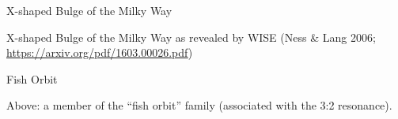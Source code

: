 \documentclass[letterpaper,landscape]{slides}
\begin{document}
\begin{slide}
\begin{center}
{\large \color{red} 
                       X-shaped Bulge of the Milky Way }
\end{center}

\begin{center}
\vskip 0.0in
\end{center}

X-shaped Bulge of the Milky Way as revealed by WISE (Ness \& Lang 2006;
\url{https://arxiv.org/pdf/1603.00026.pdf})

\vfill
\end{slide}

\begin{slide}
\begin{center}
{\large \color{red} 
                      Fish Orbit  }
\end{center}

\begin{center}
\vskip 0.0in
\end{center}

Above: a member of the ``fish orbit'' family (associated with the 3:2
resonance).

\vfill
\end{slide}
\end{document}
